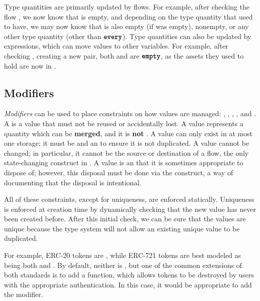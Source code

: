 \documentclass[dvipsnames, usenames, sigconf]{acmart}
\begin{document}
Type quantities are primarily updated by flows.
For example, after checking the flow , we now know that  is empty, and depending on the type quantity that  used to have, we may now know that  is also empty (if  was empty), nonempty, or any other type quantity (other than $\textbf{\texttt{every}}$).
Type quantities can also be updated by expressions, which can move values to other variables.
For example, after checking , creating a new pair, both  and  are $\textbf{\texttt{empty}}$, as the assets they used to hold are now in .

\subsection{Modifiers}\label{sec:lang-modifiers}
\emph{Modifiers} can be used to place constraints on how values are managed: , , , , and .
A  is a value that must not be reused or accidentally lost.
A  value represents a quantity which can be \textbf{merged}, and it is \textbf{not} .
A  value can only exist in at most one storage; it must be  and an  to ensure it is not duplicated.
A  value cannot be changed; in particular, it cannot be the source or destination of a flow, the only state-changing construct in \langName.
A  value is an  that it is sometimes appropriate to dispose of; however, this disposal must be done via the  construct, a way of documenting that the disposal is intentional.

All of these constraints, except for uniqueness, are enforced statically.
Uniqueness is enforced at creation time by dynamically checking that the new value has never been created before.
After this initial check, we can be sure that the values are unique because the type system will not allow an existing unique value to be duplicated.

For example, ERC-20 tokens are , while ERC-721 tokens are best modeled as being both  and .
By default, neither is , but one of the common extensions of both standards is to add a  function, which allows tokens to be destroyed by users with the appropriate authentication.
In this case, it would be appropriate to add the  modifier.
\end{document}
